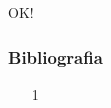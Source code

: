 \documentclass[brazil]{beamer}
\begin{document}
\begin{frame}
  \begin{center}
    \LARGE OK!
  \end{center}
\end{frame}
\begin{frame}
  \frametitle{Bibliografia}
  \begin{itemize}
    \footnotesize
    \item[1]
    \vspace{1em}
  \end{itemize}
\end{frame}
\end{document}
